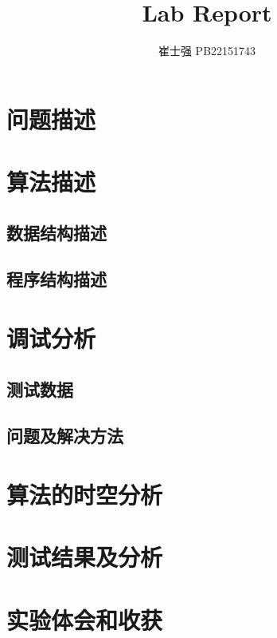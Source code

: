 \documentclass[UTF8]{ctexart}
\title{Lab Report}
\author{崔士强 PB22151743}
\date{}
\begin{document}
\maketitle

\section{问题描述}


\section{算法描述}
\subsection{数据结构描述}

\subsection{程序结构描述}

\section{调试分析}
\subsection{测试数据}

\subsection{问题及解决方法}

\section{算法的时空分析}

\section{测试结果及分析}

\section{实验体会和收获}
\end{document}
